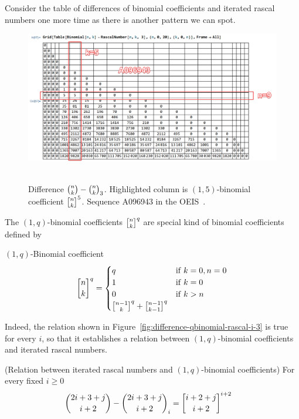 ﻿Consider the table of differences of binomial coefficients and iterated rascal numbers one more time
as there is another pattern we can spot.
\begin{figure}[H]
    \centering
    \includegraphics[width=1\textwidth]{../img/03_Difference_Binomial_Rascal_i_3_OneQBinomialCoefficients}
    ~\caption{Difference $\binom{n}{k}-\binom{n}{k}_{3}$.
    Highlighted column is $(1,5)$-binomial coefficient $\oneQBinomial{n}{k}{5}$.
    Sequence A096943 in the OEIS~\cite{sloane2004sixth}.}
    \label{fig:difference-qbinomial-rascal-i-3}
\end{figure}
The $(1,q)$-binomial coefficients $\oneQBinomial{n}{k}{q}$ are special kind of binomial coefficients defined by
\begin{definition}
    $(1,q)$-Binomial coefficient~\cite{sloane2004pascal}
    \begin{equation}
        \oneQBinomial{n}{k}{q} =
        \begin{cases}
            q & \mathrm{if} \; k=0, n=0 \\
            1 & \mathrm{if} \; k=0 \\
            0 & \mathrm{if} \; k > n \\
            \oneQBinomial{n-1}{k}{q} + \oneQBinomial{n-1}{k-1}{q}
        \end{cases}\label{eq:qbinomial-definition}
    \end{equation}
\end{definition}
Indeed, the relation shown in Figure~\eqref{fig:difference-qbinomial-rascal-i-3} is true for every $i$,
so that it establishes a relation between $(1,q)$-binomial coefficients and iterated rascal numbers.
\begin{proposition} (Relation between iterated rascal numbers and $(1,q)$-binomial coefficients)
    For every fixed $i\geq0$
    \label{prop:row-column-difference-qbinomial}
    \begin{align*}
        \binom{2i+3+j}{i+2} - \rascalNumber{2i+3+j}{i+2}{i} &= \oneQBinomial{i+2+j}{i+2}{i+2}
    \end{align*}
\end{proposition}
